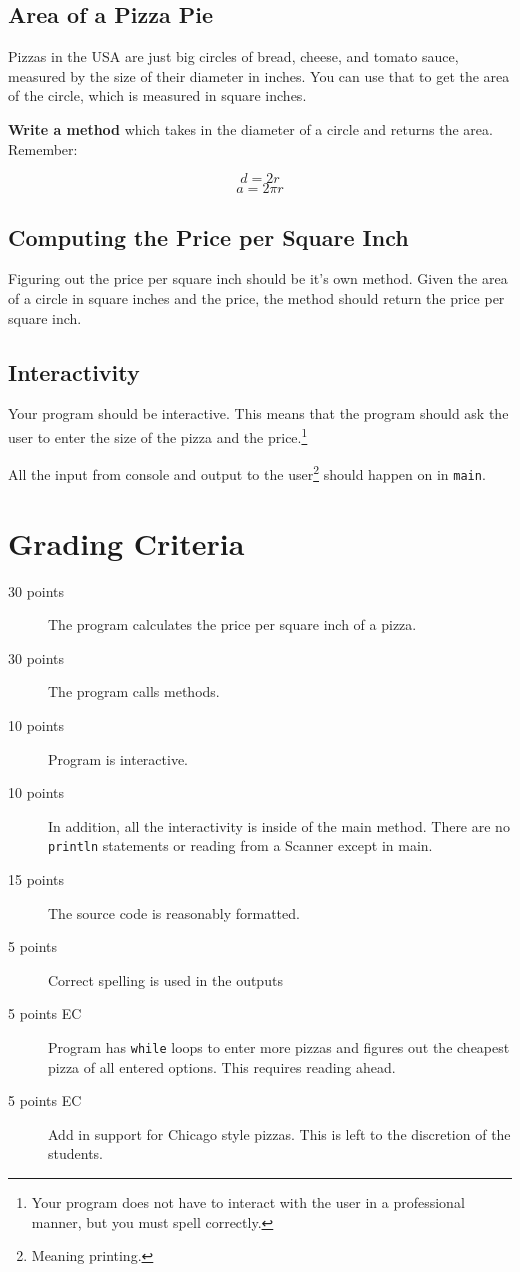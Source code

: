 \documentclass[10pt,letterpaper]{article}
\begin{document}
	\subsection{Area of a Pizza Pie}
	Pizzas in the USA are just big circles of bread, cheese, and tomato sauce, measured by the size of their diameter in inches.
	You can use that to get the area of the circle, which is measured in square inches.
	
	\textbf{Write a method} which takes in the diameter of a circle and returns the area.
	Remember:
	
	\[d =  2r\]
	\[a =  2\pi r\]
	
	
	
	
	\subsection{Computing the Price per Square Inch}
	Figuring out the price per square inch should be it's own method.
	Given the area of a circle in square inches and the price, the method should return the price per square inch.
	
	\subsection{Interactivity}
	Your program should be interactive.  
	This means that the program should ask the user to enter the size of the pizza and the price.\footnote{Your program does not have to interact with the user in a professional manner, but you must spell correctly. }
	
	All the input from console and output to  the user\footnote{Meaning printing.} should happen on in \texttt{main}.
	
	
	
	
	\section{Grading Criteria}
	
	\begin{description}
		\item[30 points] The program calculates the price per square inch of a pizza.  
		\item[30 points] The program calls methods.
		\item[10 points] Program is interactive.
		\item[10 points]  In addition, all the interactivity is inside of the main method.  There are no \texttt{println} statements or reading from a Scanner except in main.
		
		\item[15 points] The source code is reasonably formatted.
		\item[5 points] Correct spelling is used in the outputs
		
		\item[5 points EC] Program has \texttt{while} loops to enter more pizzas and figures out the cheapest pizza of all entered options.  This requires reading ahead.
		\item[5 points EC] Add in support for Chicago style pizzas.  This is left to the discretion of the students.
	\end{description}
\end{document}
